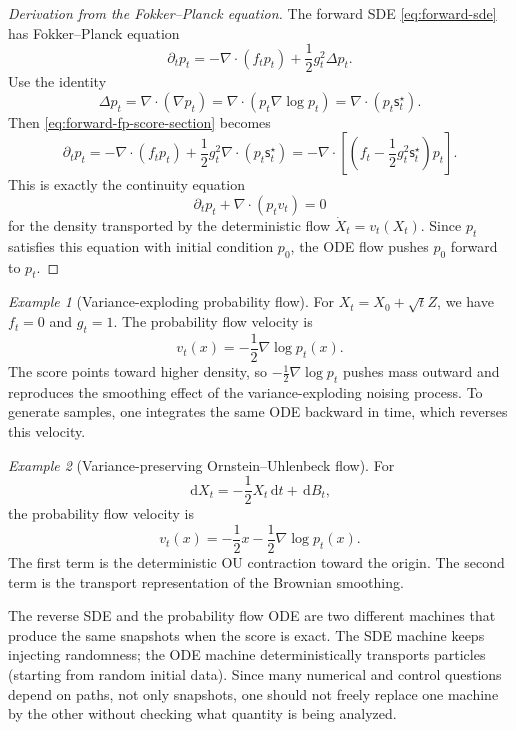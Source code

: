 \documentclass{amsart}
\numberwithin{equation}{section}
\theoremstyle{plain}
\theoremstyle{definition}
\theoremstyle{remark}
\newtheorem*{example}{Example}
\newcommand{\dd}{\,\mathrm{d}}
\newcommand{\sstar}{\mathsf{s}^{\star}}
\begin{document}
\begin{proof}[Derivation from the Fokker--Planck equation]
The forward SDE \eqref{eq:forward-sde} has Fokker--Planck equation
\begin{equation}\label{eq:forward-fp-score-section}
    \partial_t p_t
    =
    -\nabla\cdot(f_tp_t)
    +\frac12 g_t^2\Delta p_t.
\end{equation}
Use the identity
\[
    \Delta p_t
    =
    \nabla\cdot(\nabla p_t)
    =
    \nabla\cdot(p_t\nabla\log p_t)
    =
    \nabla\cdot(p_t\sstar_t).
\]
Then \eqref{eq:forward-fp-score-section} becomes
\[
    \partial_t p_t
    =
    -\nabla\cdot(f_tp_t)
    +\frac12 g_t^2\nabla\cdot(p_t\sstar_t)
    =
    -\nabla\cdot\left[
    \left(f_t-\frac12g_t^2\sstar_t\right)p_t
    \right].
\]
This is exactly the continuity equation
\begin{equation}\label{eq:continuity-pf}
    \partial_t p_t+\nabla\cdot(p_tv_t)=0
\end{equation}
for the density transported by the deterministic flow $\dot X_t=v_t(X_t)$.
Since $p_t$ satisfies this equation with initial condition $p_0$, the ODE flow
pushes $p_0$ forward to $p_t$.
\end{proof}




\begin{example}[Variance-exploding probability flow]
For $X_t=X_0+\sqrt t Z$, we have $f_t=0$ and $g_t=1$.  The probability flow
velocity is
\[
    v_t(x)=-\frac12\nabla\log p_t(x).
\]
The score points toward higher density, so $-\frac12\nabla\log p_t$ pushes mass
outward and reproduces the smoothing effect of the variance-exploding noising
process.  To generate samples, one integrates the same ODE backward in time,
which reverses this velocity.
\end{example}

\begin{example}[Variance-preserving Ornstein--Uhlenbeck flow]
For
\[
    \dd X_t=-\frac12X_t\dd t+\dd B_t,
\]
the probability flow velocity is
\[
    v_t(x)=-\frac12x-\frac12\nabla\log p_t(x).
\]
The first term is the deterministic OU contraction toward the origin.  The
second term is the transport representation of the Brownian smoothing.
\end{example}


The reverse SDE and
the probability flow ODE are two different machines that produce the same
snapshots when the score is exact.  The SDE machine keeps injecting randomness;
the ODE machine deterministically transports particles (starting from random initial data).  Since many numerical
and control questions depend on paths, not only snapshots, one should not
freely replace one machine by the other without checking what quantity is being
analyzed.
\end{document}
